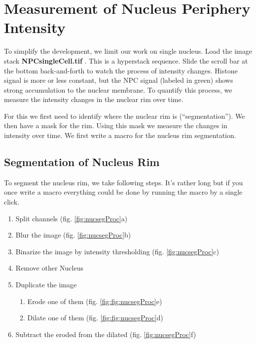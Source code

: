 \section{Measurement of Nucleus Periphery Intensity}

To simplify the development, we limit our work on single nucleus. Load the image stack \textbf{NPCsingleCell.tif} . This is a hyperstack sequence. Slide the scroll bar at the bottom back-and-forth to watch the process of intensity changes. Histone signal is more or less constant, but the NPC signal (labeled in green) shows strong accumulation to the nuclear membrane. To quantify this process, we measure the intensity changes in the nuclear rim over time.

For this we first need to identify where the nuclear rim is (``segmentation''). We then have a mask for the rim. Using this mask we measure the changes in intensity over time. We first write a macro for the nucleus rim segmentation.

\subsection{Segmentation of Nucleus Rim}

To segment the nucleus rim, we take following steps. It's rather long but if you once write a macro everything could be done by running the macro by a single click.

\begin{enumerate}
  \item Split channels (fig. \ref{fig:nucsegProc}a)
  \item Blur the image (fig. \ref{fig:nucsegProc}b)
  \item Binarize the image by intensity thresholding (fig. \ref{fig:nucsegProc}c)
  \item Remove other Nucleus
  \item Duplicate the image
  \begin{enumerate}
    \item Erode one of them (fig. \ref{fig:fig:nucsegProc}e)
    \item Dilate one of them (fig. \ref{fig:fig:nucsegProc}d)
  \end{enumerate}
  \item Subtract the eroded from the dilated (fig. \ref{fig:nucsegProc}f)
\end{enumerate}